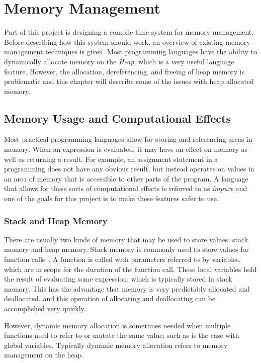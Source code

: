 \chapter{Memory Management}\label{sec:memory} 
Part of this project is designing a compile time system for memory management.
Before describing how this system should work, an overview of existing memory
management techniques is given. Most programming languages have the ability to
dynamically allocate memory on the \textit{Heap}, which is a very useful
language feature.  However, the allocation, dereferencing, and freeing of heap
memory is problematic and this chapter will describe some of the issues with
heap allocated memory.

\section{Memory Usage and Computational Effects}
Most practical programming languages allow for storing and referencing areas
in memory. When an expression is evaluated, it may have an effect on memory as
well as returning a result. For example, an assignment statement in a programming
does not have any obvious result, but instead operates on values in an area of
memory that is accessible to other parts of the program. A language that allows
for these sorts of computational effects is referred to as \textit{impure} and
one of the goals for this project is to make these features safer to use.

\subsection{Stack and Heap Memory}
There are usually two kinds of memory that may be used to store values: stack
memory and heap memory. Stack memory is commonly used to store values for
function calls~\cite{appel}. A function is called with parameters referred to by variables,
which are in scope for the duration of the function call. These local variables
hold the result of evaluating some expression, which is typically stored in
stack memory. This has the advantage that memory is very predictably allocated
and deallocated, and this operation of allocating and deallocating can be
accomplished very quickly. 

However, dynamic memory allocation is sometimes needed when multiple functions
need to refer to or mutate the same value; such as is the case with global
variables. Typically dynamic memory allocation refers to memory management on 
the heap.

